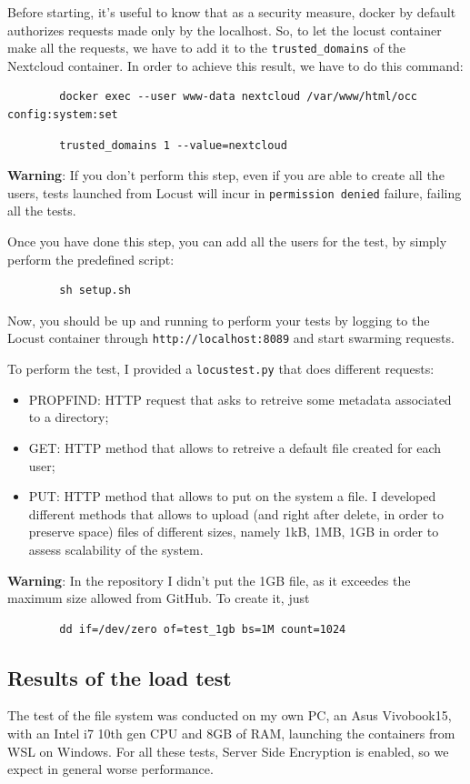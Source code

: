 \documentclass{article}
\begin{document}
	Before starting, it's useful to know that as a security measure, docker by default authorizes requests made only by the localhost. So, to let the locust container make all the requests, we have to add it to the \verb|trusted_domains| of the Nextcloud container. In order to achieve this result, we have to do this command:
	\begin{verbatim}
		docker exec --user www-data nextcloud /var/www/html/occ config:system:set
	\end{verbatim}
	\begin{verbatim}
		trusted_domains 1 --value=nextcloud
	\end{verbatim}
	
	\textbf{Warning}: If you don't perform this step, even if you are able to create all the users, tests launched from Locust will incur in \verb|permission denied| failure, failing all the tests.
	
	Once you have done this step, you can add all the users for the test, by simply perform the predefined script:
	\begin{verbatim}
		sh setup.sh
	\end{verbatim}
		
	Now, you should be up and running to perform your tests by logging to the Locust container through \verb|http://localhost:8089| and start swarming requests.
	
	To perform the test, I provided a \verb|locustest.py| that does different requests:
	\begin{itemize}
		\item PROPFIND: HTTP request that asks to retreive some metadata associated to a directory;
		\item GET: HTTP method that allows to retreive a default file created for each user;
		\item PUT: HTTP method that allows to put on the system a file. I developed 
		different methods that allows to upload (and right after delete, in order to preserve space) files of different sizes, namely 1kB, 1MB, 1GB in order to assess scalability of the system.
	\end{itemize}

	\textbf{Warning}: In the repository I didn't put the 1GB file, as it exceedes the maximum size allowed from GitHub. To create it, just
	\begin{verbatim}
		dd if=/dev/zero of=test_1gb bs=1M count=1024
	\end{verbatim}
	
	\subsection{Results of the load test}
	The test of the file system was conducted on my own PC, an Asus Vivobook15, with an Intel i7 10th gen CPU and 8GB of RAM, launching the containers from WSL on Windows. For all these tests, Server Side Encryption is enabled, so we expect in general worse performance.
	
\end{document}
